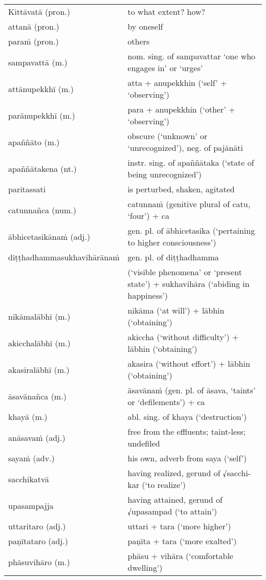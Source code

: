 \documentclass[11pt,oneside]{memoir}
\begin{document}
\begin{longtable}{L{\colOne} L{\colTwo+10mm}}
Kittāvatā (pron.) & to what extent? how?\\[0pt]
attanā (pron.) & by oneself\\[0pt]
paraṁ (pron.) & others\\[0pt]
sampavattā (m.) & nom. sing. of sampavattar `one who engages in' or `urges'\\[0pt]
attānupekkhī (m.) & atta + anupekkhin (`self' + `observing')\\[0pt]
parānupekkhī (m.) & para + anupekkhin (`other' + `observing')\\[0pt]
apaññāto (m.) & obscure (`unknown' or `unrecognized'), neg. of pajānāti\\[0pt]
apaññātakena (nt.) & instr. sing. of apaññātaka (`state of being unrecognized')\\[0pt]
paritassati & is perturbed, shaken, agitated\\[0pt]
catunnañca (num.) & catunnaṁ (genitive plural of catu, `four') + ca\\[0pt]
ābhicetasikānaṁ (adj.) & gen. pl. of ābhicetasika (`pertaining to higher consciousness')\\[0pt]
diṭṭhadhammasukhavihārānaṁ & gen. pl. of diṭṭhadhamma\\[0pt]
 & (`visible phenomena' or `present state') + sukhavihāra (`abiding in happiness')\\[0pt]
nikāmalābhī (m.) & nikāma (`at will') + lābhin (`obtaining')\\[0pt]
akicchalābhī (m.) & akiccha (`without difficulty') + lābhin (`obtaining')\\[0pt]
akasiralābhī (m.) & akasira (`without effort') + lābhin (`obtaining')\\[0pt]
āsavānañca (m.) & āsavānaṁ (gen. pl. of āsava, `taints' or `defilements') + ca\\[0pt]
khayā (m.) & abl. sing. of khaya (`destruction')\\[0pt]
anāsavaṁ (adj.) & free from the effluents; taint-less; undefiled\\[0pt]
sayaṁ (adv.) & his own, adverb from saya (`self')\\[0pt]
sacchikatvā & having realized, gerund of √sacchi-kar (`to realize')\\[0pt]
upasampajja & having attained, gerund of √upasampad (`to attain')\\[0pt]
uttaritaro (adj.) & uttari + tara (`more higher')\\[0pt]
paṇītataro (adj.) & paṇīta + tara (`more exalted')\\[0pt]
phāsuvihāro (m.) & phāsu + vihāra (`comfortable dwelling')\\[0pt]
\end{longtable}
\end{document}
